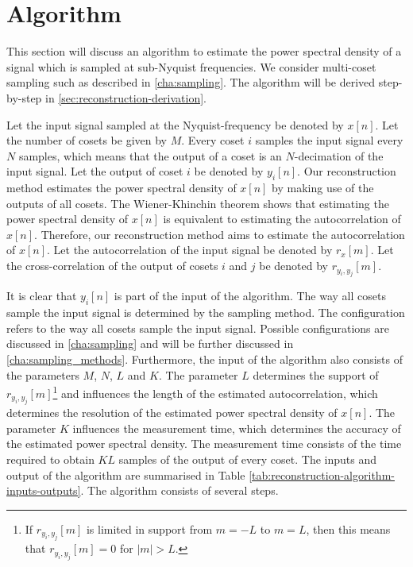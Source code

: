 \documentclass[a4paper, openany, oneside]{memoir}
\begin{document}
\section{Algorithm}
\label{sec:reconstruction-algorithm}
This section will discuss an algorithm to estimate the power spectral density of a signal which is sampled at sub-Nyquist frequencies. We consider multi-coset sampling such as described in \cref{cha:sampling}. The algorithm will be derived step-by-step in \cref{sec:reconstruction-derivation}.

Let the input signal sampled at the Nyquist-frequency be denoted by $x[n]$. Let the number of cosets be given by $M$. Every coset $i$ samples the input signal every $N$ samples, which means that the output of a coset is an $N$-decimation of the input signal. Let the output of coset $i$ be denoted by $y_i[n]$. Our reconstruction method estimates the power spectral density of $x[n]$ by making use of the outputs of all cosets. The Wiener-Khinchin theorem shows that estimating the power spectral density of $x[n]$ is equivalent to estimating the autocorrelation of $x[n]$. Therefore, our reconstruction method aims to estimate the autocorrelation of $x[n]$. Let the autocorrelation of the input signal be denoted by $r_x[m]$. Let the cross-correlation of the output of cosets $i$ and $j$ be denoted by $r_{y_i,y_j}[m]$. 

It is clear that $y_i[n]$ is part of the input of the algorithm. The way all cosets sample the input signal is determined by the sampling method. The configuration refers to the way all cosets sample the input signal. Possible configurations are discussed in \ref{cha:sampling} and will be further discussed in \ref{cha:sampling_methods}. Furthermore, the input of the algorithm also consists of the parameters $M$, $N$, $L$ and $K$. The parameter $L$ determines the support of $r_{y_i,y_j}[m]$\footnote{If $r_{y_i,y_j}[m]$ is limited in support from $m=-L$ to $m=L$, then this means that $r_{y_i,y_j}[m]=0$ for $|m|>L$.} and influences the length of the estimated autocorrelation, which determines the resolution of the estimated power spectral density of $x[n]$. The parameter $K$ influences the measurement time, which determines the accuracy of the estimated power spectral density. The measurement time consists of the time required to obtain $KL$ samples of the output of every coset. The inputs and output of the algorithm are summarised in Table \ref{tab:reconstruction-algorithm-inputs-outputs}. The algorithm consists of several steps.
\end{document}
